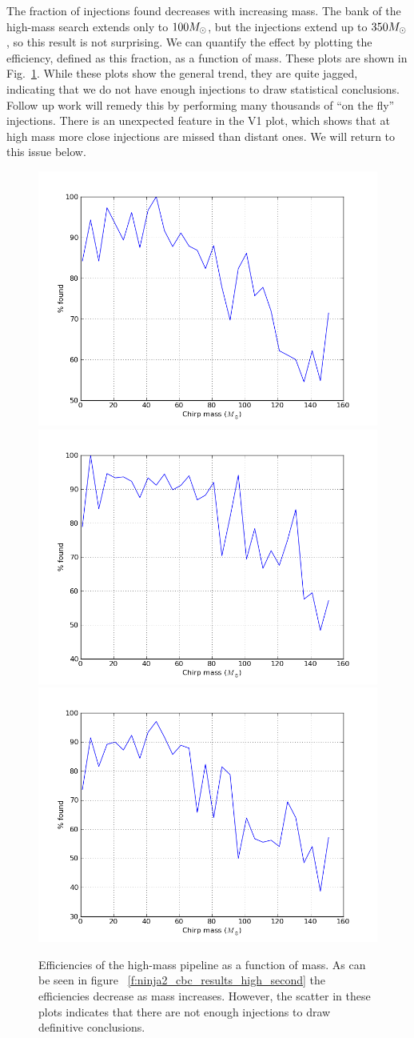 The fraction of injections found decreases with increasing mass.  The
bank of the high-mass search extends only to $100 M_\odot$, but the
injections extend up to $350 M_\odot$, so this result is not surprising.
We can quantify the effect by plotting the efficiency, defined as this
fraction, as a function of mass.  These plots are shown in
Fig.~\ref{f:high_mass_efficiencies}.  While these plots show the
general trend, they are quite jagged, indicating that we do not have
enough injections to draw statistical conclusions.  Follow up work
will remedy this by performing many thousands of ``on the fly''
injections.  There is an unexpected feature in the V1 plot, which
shows that at high mass more close injections are missed than distant
ones.  We will return to this issue below.

\begin{figure}
  \includegraphics[width=0.5\linewidth]{figures/ninja2_results/H_second_mass_high_efficiency}
  \includegraphics[width=0.5\linewidth]{figures/ninja2_results/L_second_mass_high_efficiency} \\
  \includegraphics[width=0.5\linewidth]{figures/ninja2_results/V_second_mass_high_efficiency}
  \caption[Efficiency of the high-mass pipeline as a function of mass]{
  \label{f:high_mass_efficiencies}
Efficiencies of the high-mass pipeline as a function of mass.  As
can be seen in figure ~\ref{f:ninja2_cbc_results_high_second} the
efficiencies decrease as mass increases.  However, the scatter in
these plots indicates that there are not enough injections to draw
definitive conclusions.
}
\end{figure}%

